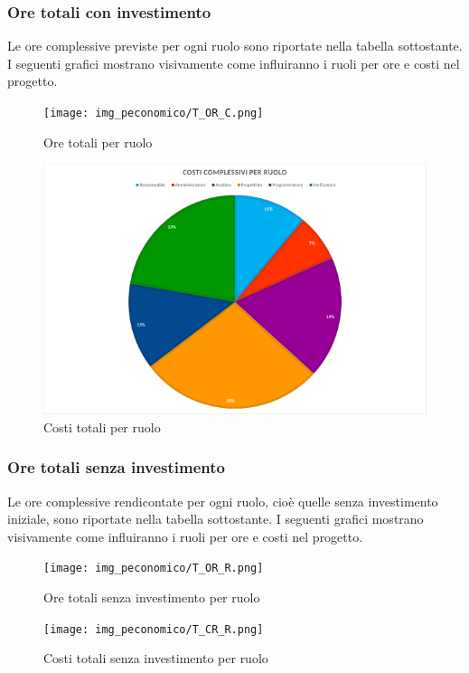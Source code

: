 \subsubsection{Ore totali con investimento}
Le ore complessive previste per ogni ruolo sono riportate nella tabella sottostante.
I seguenti grafici mostrano visivamente come influiranno i ruoli per ore e costi nel progetto.
\begin{figure}[H]
	\centering
	\texttt{[image: img\_peconomico/T\_OR\_C.png]}
	\caption{Ore totali per ruolo}
\end{figure}
\begin{figure}[H]
	\centering
	\includegraphics[width=14cm]{img_peconomico/T_CR_C.png}
	\caption{Costi totali per ruolo}
\end{figure}

\subsubsection{Ore totali senza investimento}
Le ore complessive rendicontate per ogni ruolo, cioè quelle senza investimento iniziale, sono riportate nella tabella sottostante.
I seguenti grafici mostrano visivamente come influiranno i ruoli per ore e costi nel progetto.
\begin{figure}[H]
	\centering
	\texttt{[image: img\_peconomico/T\_OR\_R.png]}
	\caption{Ore totali senza investimento per ruolo}
\end{figure}
\begin{figure}[H]
	\centering
	\texttt{[image: img\_peconomico/T\_CR\_R.png]}
	\caption{Costi totali senza investimento per ruolo}
\end{figure}





